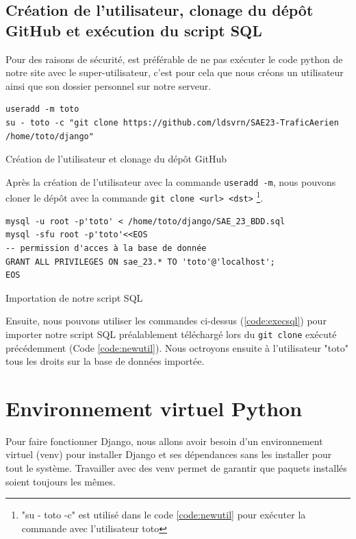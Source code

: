 \documentclass{article}
\begin{document}
        \subsection{Création de l'utilisateur, clonage du dépôt GitHub et exécution du script SQL}
        Pour des raisons de sécurité, est préférable de ne pas exécuter le code python de notre site avec le super-utilisateur, c'est pour cela que nous créons un utilisateur ainsi que son dossier personnel sur notre serveur. 
        \begin{listing}[H]
            \begin{verbatim}
useradd -m toto
su - toto -c "git clone https://github.com/ldsvrn/SAE23-TraficAerien /home/toto/django"
            \end{verbatim}
            \caption{Création de l'utilisateur et clonage du dépôt GitHub}
            \label{code:newutil}
        \end{listing}
        Après la création de l'utilisateur avec la commande \verb|useradd -m|, nous pouvons cloner le dépôt avec la commande \verb|git clone <url> <dst>|
        \footnote{\label{note1}"su - toto -c" est utilisé dans le code \ref{code:newutil} pour exécuter la commande avec l'utilisateur toto}.

        \begin{listing}[H]
            \begin{verbatim}
mysql -u root -p'toto' < /home/toto/django/SAE_23_BDD.sql
mysql -sfu root -p'toto'<<EOS
-- permission d'acces à la base de donnée
GRANT ALL PRIVILEGES ON sae_23.* TO 'toto'@'localhost';
EOS
            \end{verbatim}
            \caption{Importation de notre script SQL}
            \label{code:execsql}
        \end{listing}
        Ensuite, nous pouvons utiliser les commandes ci-dessus (\ref{code:execsql}) pour importer notre script SQL préalablement téléchargé lors du \verb|git clone| exécuté précédemment (Code \ref{code:newutil}). Nous octroyons ensuite à l'utilisateur "toto" tous les droits sur la base de données importée.

\section{Environnement virtuel Python}
    Pour faire fonctionner Django, nous allons avoir besoin d'un environnement virtuel (venv) pour installer Django et ses dépendances sans les installer pour tout le système. Travailler avec des venv permet de garantir que paquets installés soient toujours les mêmes. 
\end{document}
